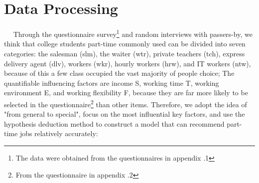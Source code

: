 \documentclass[12pt]{article}
\begin{document}
\section{Data Processing}
~~
Through the questionnaire survey\footnote[1]{The data were obtained from the questionnaires in appendix .1} and random interviews with passers-by, we think that college students part-time commonly used can be divided into seven categories: the salesman (slm), the waiter (wtr), private teachers (tch), express delivery agent (dlv), workers (wkr), hourly workers (hrw), and IT workers (ntw), because of this a few class occupied the vast majority of people choice; The quantifiable influencing factors are income S, working time T, working environment E, and working flexibility F, because they are far more likely to be selected in the questionnaire\footnote[1]{From the questionnaire in appendix .2} than other items. Therefore, we adopt the idea of "from general to special", focus on the most influential key factors, and use the hypothesis deduction method to construct a model that can recommend part-time jobs relatively accurately:
\end{document}
